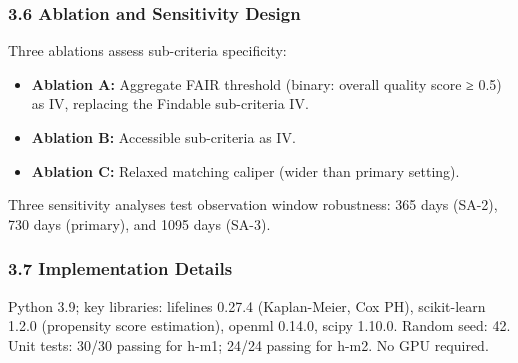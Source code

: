 \subsubsection{3.6 Ablation and Sensitivity Design}

Three ablations assess sub-criteria specificity:
\begin{itemize}
\item \textbf{Ablation A:} Aggregate FAIR threshold (binary: overall quality score ≥ 0.5) as IV, replacing the Findable sub-criteria IV.
\item \textbf{Ablation B:} Accessible sub-criteria as IV.
\item \textbf{Ablation C:} Relaxed matching caliper (wider than primary setting).
\end{itemize}

Three sensitivity analyses test observation window robustness: 365 days (SA-2), 730 days (primary), and 1095 days (SA-3).

\subsubsection{3.7 Implementation Details}

Python 3.9; key libraries: lifelines 0.27.4 (Kaplan-Meier, Cox PH), scikit-learn 1.2.0 (propensity score estimation), openml 0.14.0, scipy 1.10.0. Random seed: 42. Unit tests: 30/30 passing for h-m1; 24/24 passing for h-m2. No GPU required.

